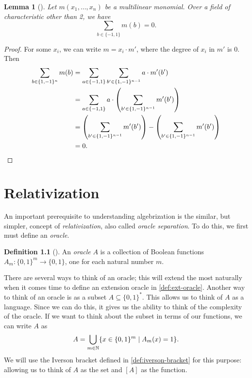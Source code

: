 \documentclass[english]{reedthesis}
\theoremstyle{plain}
\newtheorem{lemma}[lemma]{Lemma}
\theoremstyle{definition}
\newtheorem{defn}[defn]{Definition}
\theoremstyle{remark}
\begin{document}

\begin{lemma}[{\cite[Lemma 7]{JKRS09}}]\label{lem:monomial-sum}
  Let $m(x_{1}, \ldots, x_{n})$ be a multilinear monomial. Over a field of
  characteristic other than 2, we have
  \begin{equation}
    \sum_{b \in \{-1, 1\}}m(b) = 0.
  \end{equation}
\end{lemma}

\begin{proof}
  For some $x_{i}$, we can write $m = x_{i} \cdot m'$, where the degree of $x_{i}$
  in $m'$ is 0. Then
  \begin{align*}
    \sum_{b \in \{1, -1\}^{n}}m(b)
    &= \sum_{a \in \{-1, 1\}}\sum_{b' \in \{1, -1\}^{n-1}}a \cdot m'(b') \\
    &= \sum_{a \in \{-1, 1\}} a \cdot \mleft(\sum_{b' \in \{1, -1\}^{n-1}} m'(b')\mright) \\
    &= \mleft(\sum_{b' \in \{1, -1\}^{n-1}} m'(b')\mright) - \mleft(\sum_{b' \in \{1, -1\}^{n-1}} m'(b')\mright) \\
    &= 0.
  \end{align*}
\end{proof}

\chapter{Relativization}


An important prerequisite to understanding algebrization is the similar, but
simpler, concept of \emph{relativization}, also called \emph{oracle separation}.
To do this, we first must define an \emph{oracle}.
\begin{defn}[{\cite[Def.\ 2.1]{AW09}}]\label{def:oracle}
  An \emph{oracle} $A$ is a collection of Boolean functions
  $A_{m}: \{0, 1\}^{m} \rightarrow \{0, 1\}$, one for each natural number $m$.
\end{defn}
There are several ways to think of an oracle; this will extend the most
naturally when it comes time to define an extension oracle in
\cref{def:ext-oracle}. Another way to think of an oracle is as a subset
$A \subseteq \{0, 1\}^{*}$. This allows us to think of $A$ as a language. Since we can
do this, it gives us the ability to think of the complexity of the oracle. If we
want to think about the subset in terms of our functions, we can write $A$ as
\begin{equation}
  A = \bigcup_{m \in \mathbb{N}}\mleft\{x \in \{0, 1\}^{m} \mid A_{m}(x) = 1\mright\}.
\end{equation}
We will use the Iverson bracket defined in \cref{def:iverson-bracket} for this
purpose: allowing us to think of $A$ as the set and $[A]$ as the function.
\end{document}
